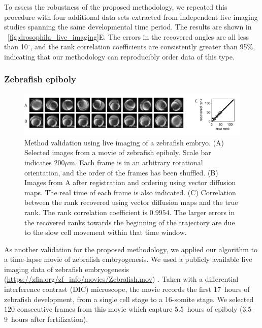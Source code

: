 To assess the robustness of the proposed methodology, we repeated this procedure with four additional data sets extracted from independent live imaging studies spanning the same developmental time period.
%
The results are shown in \fig~\ref{fig:drosophila_live_imaging}E.
%
The errors in the recovered angles are all less than 10$^\circ$, and the rank correlation coefficients are consistently greater than 95\%, indicating that our methodology can reproducibly order data of this type.


\subsubsection{Zebrafish epiboly}

\begin{figure}[t]
\includegraphics[width=\textwidth]{fig4}
\caption[Method validation using live imaging of a zebrafish embryo]{Method validation using live imaging of a zebrafish embryo. (A) Selected images from a movie of zebrafish epiboly. Scale bar indicates 200$\mu$m. Each frame is in an arbitrary rotational orientation, and the order of the frames has been shuffled. (B) Images from A after registration and ordering using vector diffusion maps. The real time of each frame is also indicated. (C) Correlation between the rank recovered using vector diffusion maps and the true rank.  The rank correlation coefficient is $0.9954$. The larger errors in the recovered ranks towards the beginning of the trajectory are due to the slow cell movement within that time window. }
\label{fig:zebrafish}
\end{figure}

As another validation for the proposed methodology, we applied our algorithm to a time-lapse movie  of zebrafish embryogenesis.
%
We used a publicly available live imaging data of zebrafish embryogenesis (\url{https://zfin.org/zf\_info/movies/Zebrafish.mov}) \cite{karlstrom1996flipbook}.
%
Taken with a differential interference contrast (DIC) microscope, the movie records the first $17$~hours of zebrafish development, from a single cell stage to a 16-somite stage.
%
We selected $120$ consecutive frames from this movie which capture 5.5~hours of epiboly (3.5--9~hours after fertilization).

